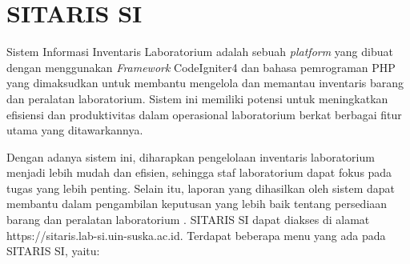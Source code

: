 \section{SITARIS SI}
Sistem Informasi Inventaris Laboratorium adalah sebuah \textit{platform} yang dibuat dengan menggunakan \textit{Framework} CodeIgniter4 dan bahasa pemrograman PHP yang dimaksudkan untuk membantu mengelola dan memantau inventaris barang dan peralatan laboratorium. Sistem ini memiliki potensi untuk meningkatkan efisiensi dan produktivitas dalam operasional laboratorium berkat berbagai fitur utama yang ditawarkannya.

Dengan adanya sistem ini, diharapkan pengelolaan inventaris laboratorium menjadi lebih mudah dan efisien, sehingga staf laboratorium dapat fokus pada tugas yang lebih penting. Selain itu, laporan yang dihasilkan oleh sistem dapat membantu dalam pengambilan keputusan yang lebih baik tentang persediaan barang dan peralatan laboratorium \cite{sitaris-lab-si-website}. SITARIS SI dapat diakses di alamat https://sitaris.lab-si.uin-suska.ac.id. Terdapat beberapa menu yang ada pada SITARIS SI, yaitu:


